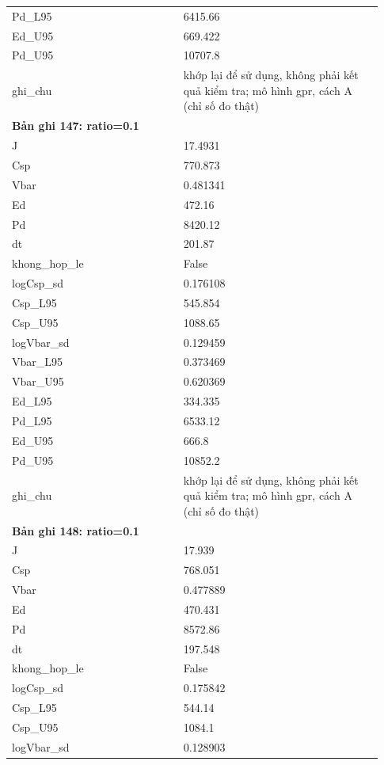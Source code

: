 \begin{longtable}{p{0.43\linewidth}p{0.50\linewidth}}
Pd\_\allowbreak L95 & 6415.66 \\
Ed\_\allowbreak U95 & 669.422 \\
Pd\_\allowbreak U95 & 10707.8 \\
ghi\_\allowbreak chu & khớp lại để sử dụng, không phải kết quả kiểm tra; mô hình gpr, cách A (chỉ số đo thật) \\
\midrule
\multicolumn{2}{p{0.95\linewidth}}{\textbf{Bản ghi 147: ratio=0.1}} \\
J & 17.4931 \\
Csp & 770.873 \\
Vbar & 0.481341 \\
Ed & 472.16 \\
Pd & 8420.12 \\
dt & 201.87 \\
khong\_\allowbreak hop\_\allowbreak le & False \\
logCsp\_\allowbreak sd & 0.176108 \\
Csp\_\allowbreak L95 & 545.854 \\
Csp\_\allowbreak U95 & 1088.65 \\
logVbar\_\allowbreak sd & 0.129459 \\
Vbar\_\allowbreak L95 & 0.373469 \\
Vbar\_\allowbreak U95 & 0.620369 \\
Ed\_\allowbreak L95 & 334.335 \\
Pd\_\allowbreak L95 & 6533.12 \\
Ed\_\allowbreak U95 & 666.8 \\
Pd\_\allowbreak U95 & 10852.2 \\
ghi\_\allowbreak chu & khớp lại để sử dụng, không phải kết quả kiểm tra; mô hình gpr, cách A (chỉ số đo thật) \\
\midrule
\multicolumn{2}{p{0.95\linewidth}}{\textbf{Bản ghi 148: ratio=0.1}} \\
J & 17.939 \\
Csp & 768.051 \\
Vbar & 0.477889 \\
Ed & 470.431 \\
Pd & 8572.86 \\
dt & 197.548 \\
khong\_\allowbreak hop\_\allowbreak le & False \\
logCsp\_\allowbreak sd & 0.175842 \\
Csp\_\allowbreak L95 & 544.14 \\
Csp\_\allowbreak U95 & 1084.1 \\
logVbar\_\allowbreak sd & 0.128903 \\

\end{longtable}
